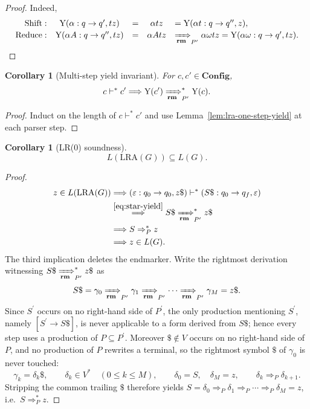 \documentclass[11pt,a4paper]{article}
\theoremstyle{prettyplain}
\newtheorem{corollary}[theorem]{Corollary}
\theoremstyle{prettydef}
\newcommand{\eps}{\varepsilon}
\newcommand{\LRA}{\mathrm{LRA}}
\newcommand{\RMP}{\xRightarrow[\mathbf{rm}]{}_{P^\prime}}
\newcommand{\DerP}{\Rightarrow_P}
\newcommand{\Path}[3]{#1:#2\to#3}
\newcommand{\Item}[2]{[#1\to #2]}
\newcommand{\Config}{\mathbf{Config}}
\begin{document}
\begin{proof}
Indeed,
\[
\begin{array}{rclcl}
\mathrm{Shift}:&
\mathrm{Y}(\Path{\alpha}{q}{q^\prime},tz)
&=&\alpha tz
&=\mathrm{Y}(\Path{\alpha t}{q}{q^{\prime\prime}},z),\\[2pt]
\mathrm{Reduce}:&
\mathrm{Y}(\Path{\alpha A}{q}{q^{\prime\prime}},tz)
&=&\alpha A t z
&\RMP \alpha\omega t z
=\mathrm{Y}(\Path{\alpha\omega}{q}{q^\prime},tz).
\end{array}
\]
\end{proof}

\begin{corollary}[Multi-step yield invariant]\label{cor:lra-star-yield}
For \(c,c'\in\Config\),
\begin{equation}\label{eq:star-yield}
c\vdash^* c'
\Longrightarrow
\mathrm{Y}(c')\RMP^*\mathrm{Y}(c).
\end{equation}
\end{corollary}

\begin{proof}
Induct on the length of \(c\vdash^*c'\) and use
Lemma~\ref{lem:lra-one-step-yield} at each parser step.
\end{proof}

\begin{corollary}[LR(0) soundness]\label{cor:lra-sound}
\[
L(\LRA(G))\subseteq L(G).
\]
\end{corollary}

\begin{proof}
\[
\begin{aligned}
z\in L(\LRA(G))
&\Longrightarrow
(\Path{\eps}{q_0}{q_0},z\$)
\vdash^*
(\Path{S\$}{q_0}{q_f},\eps)\\
&\overset{\eqref{eq:star-yield}}{\Longrightarrow}
S\$\RMP^*z\$\\
&\Longrightarrow
S\DerP^*z\\
&\Longrightarrow
z\in L(G).
\end{aligned}
\]
The third implication deletes the endmarker.  Write the rightmost derivation
witnessing \(S\$\RMP^*z\$\) as
\[
S\$=\gamma_0\RMP\gamma_1\RMP\cdots\RMP\gamma_M=z\$ .
\]
Since \(S^\prime\) occurs on no right-hand side of \(P^\prime\), the only
production mentioning \(S^\prime\), namely \(\Item{S^\prime}{S\$}\), is never
applicable to a form derived from \(S\$\); hence every step uses a production of
\(P\subseteq P^\prime\).  Moreover \(\$\notin V\) occurs on no right-hand side of
\(P\), and no production of \(P\) rewrites a terminal, so the rightmost symbol
\(\$\) of \(\gamma_0\) is never touched:
\[
\gamma_k=\delta_k\$,\qquad \delta_k\in V^{*}\quad(0\le k\le M),
\qquad \delta_0=S,\quad \delta_M=z,
\qquad \delta_k\DerP\delta_{k+1}.
\]
Stripping the common trailing \(\$\) therefore yields
\(S=\delta_0\DerP\delta_1\DerP\cdots\DerP\delta_M=z\), i.e.\ \(S\DerP^*z\).
\end{proof}
\end{document}
